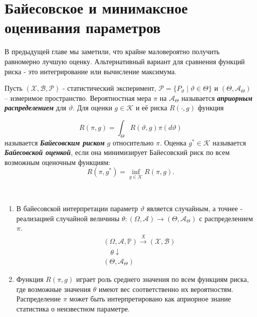 \graphicspath{{./chapters/chapter03/}}
\chapter{Байесовское и минимаксное оценивания параметров}

В предыдущей главе мы заметили, что крайне маловероятно получить равномерно лучшую оценку. Альтернативный вариант для сравнения функций риска - это интегрирование или вычисление максимума.

\begin{defn}
	Пусть $(\mathcal{X}, \mathcal{B}, \mathcal{P})$ - статистический эксперимент, $\mathcal{P}=\{P_{\vartheta} \mid \vartheta \in \Theta\}$ и $(\Theta, \mathcal{A}_{\Theta})$ -- измеримое пространство. Вероятностная мера $\pi$ на $\mathcal{A}_{\Theta}$ называется \textbf{\textit{априорным распределением}} для $\vartheta$. Для оценки $g \in \mathcal{K}$ и её риска $R(\cdot, g)$ функция
	
	\[ R(\pi, g)=\int_{\Theta} R(\vartheta, g) \pi(d\vartheta) \]
	называется \textbf{\textit{Байесовским риском}} $g$ относительно $\pi$. Оценка $g^* \in \mathcal{K}$ называется \textbf{\textit{Байесовской оценкой}}, если она минимизирует Байесовский риск по всем возможным оценочным функциям:
	\[R(\pi, g^*)=\inf_{g \in \mathcal{K}}R(\pi, g).\]
\end{defn}

\begin{rmrk} \
	\begin{enumerate}
		\item В байесовской интерпретации параметр $\vartheta$ является случайным, а точнее - реализацией случайной величины $\theta\colon(\Omega, \mathcal{A}) \rightarrow (\Theta,\mathcal{A}_{\Theta})$ с распределением $\pi$.
		\begin{align*}
		& (\Omega, \mathcal{A}, \mathbb{P}) \xrightarrow{X} (\mathcal{X}, \mathcal{B}) \\
		& \quad \theta \downarrow \\
		& (\Theta,\mathcal{A}_{\Theta})
		\end{align*}
		\item Функция $R(\pi, g)$ играет роль среднего значения по всем функциям риска, где возможные значения $\theta$ имеют вес соответственно их вероятностям. Распределение $\pi$ может быть интерпретировано как априорное знание статистика о неизвестном параметре.
	\end{enumerate}
\end{rmrk}

